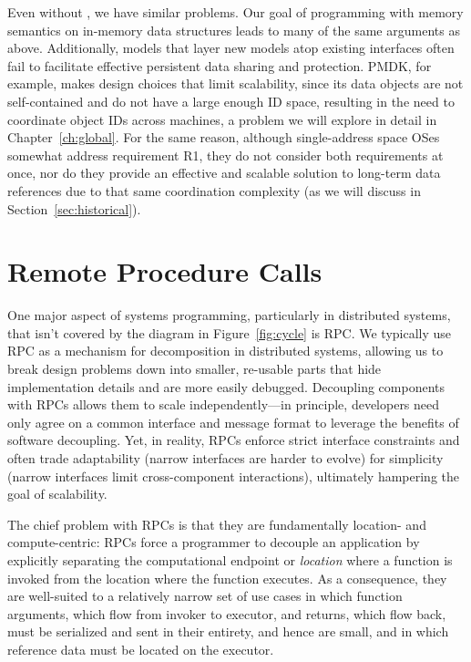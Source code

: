 Even without \NVM, we have similar problems. Our goal of programming with memory semantics on in-memory data structures
leads to many of the same arguments as above.
Additionally, models that layer new models atop existing interfaces often fail to facilitate effective persistent data sharing and
protection.  PMDK, for example, makes design choices that limit
scalability, since its
data objects are not self-contained and do not have a large enough ID space, resulting
in the need to coordinate object IDs across machines, a problem we will explore in detail in Chapter~\ref{ch:global}. For the same reason,
although single-address space OSes~\cite{chase:tocs94} somewhat address requirement R1, they do
not consider both requirements at once, nor do they provide an effective and scalable solution to
long-term data references due to that same coordination complexity (as we will discuss in Section~\ref{sec:historical}).




\section{Remote Procedure Calls}

One major aspect of systems programming, particularly in distributed systems, that isn't covered by the diagram in
Figure~\ref{fig:cycle} is RPC. We typically use RPC as a mechanism for decomposition in distributed systems, allowing us
to break design problems down into smaller, re-usable parts that hide implementation details and are more easily debugged.
Decoupling components with RPCs allows them to scale
independently---in principle, developers need only agree
on a common interface and message format to leverage the
benefits of software decoupling. Yet, in reality,
RPCs enforce strict interface constraints and often
trade adaptability (narrow interfaces are harder to evolve) for
simplicity (narrow interfaces limit cross-component interactions),
ultimately hampering the goal of scalability.


The chief problem with RPCs is that they are fundamentally location-
and compute-centric: RPCs force a
programmer to decouple an application by explicitly separating the
computational endpoint or \emph{location} where a function is invoked
from the location where the function executes.  As a consequence, they are
well-suited to a relatively narrow set of use cases in which
function arguments, which flow from invoker to executor, and
returns, which flow back, must be serialized and sent in their
entirety, and hence are small, and in which reference data must be
located on the executor.


